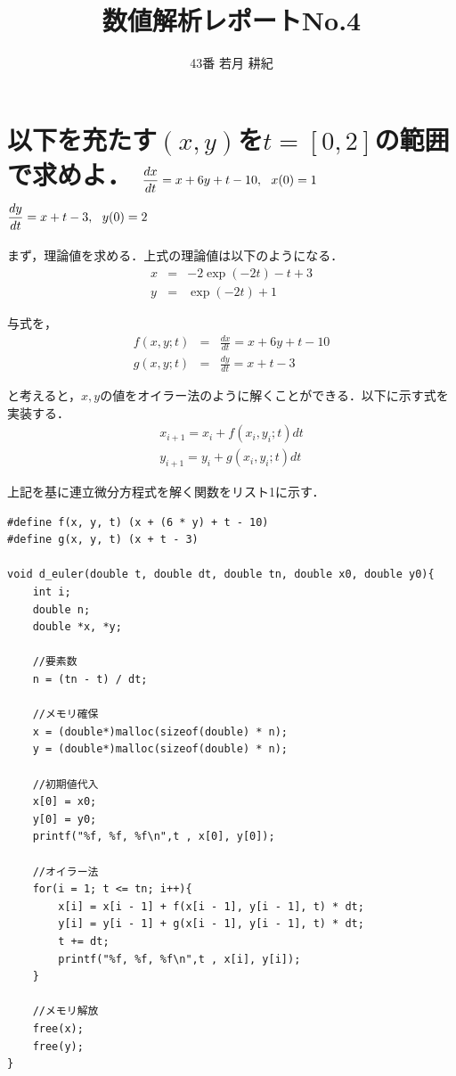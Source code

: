 \documentclass[dvipdfmx,titlepage]{jsarticle}
\title{\Huge{数値解析レポートNo.4}}
\author{\huge{43番 若月 耕紀}}
\date{}
\begin{document}
\maketitle
\newpage


\section{以下を充たす$(x, y)$を$t = [0, 2]$の範囲で求めよ．\protect\linebreak
$\dfrac{dx}{dt} = x + 6y + t - 10, \:\:\:x(0) = 1\raisebox{4ex}{\mbox{}}$\protect\linebreak
$\dfrac{dy}{dt} = x + t - 3, \:\:\:y(0) = 2\raisebox{4ex}{\mbox{}}$}
\:

まず，理論値を求める．上式の理論値は以下のようになる．
\begin{eqnarray}
x &=& -2\exp(-2t)-t+3 \nonumber \\
y &=& \exp(-2t)+1 \nonumber
\end{eqnarray}

与式を，
\begin{eqnarray}
f(x, y; t) &=& \frac{dx}{dt} = x + 6y + t - 10 \nonumber \\
g(x, y; t) &=& \frac{dy}{dt} = x + t - 3 \nonumber
\end{eqnarray}

と考えると，$x, y$の値をオイラー法のように解くことができる．以下に示す式を実装する．
\begin{eqnarray}
x_{i+1} = x_i + f(x_i, y_i; t)dt \nonumber \\
y_{i+1} = y_i + g(x_i, y_i; t)dt \nonumber
\end{eqnarray}

上記を基に連立微分方程式を解く関数をリスト1に示す．

\begin{lstlisting}[caption=d\_euler, label=c]
#define f(x, y, t) (x + (6 * y) + t - 10)
#define g(x, y, t) (x + t - 3)

void d_euler(double t, double dt, double tn, double x0, double y0){
	int i;
	double n;
	double *x, *y;

	//要素数
	n = (tn - t) / dt;

	//メモリ確保
	x = (double*)malloc(sizeof(double) * n);
	y = (double*)malloc(sizeof(double) * n);

	//初期値代入
	x[0] = x0;
	y[0] = y0;
	printf("%f, %f, %f\n",t , x[0], y[0]);

	//オイラー法
	for(i = 1; t <= tn; i++){
		x[i] = x[i - 1] + f(x[i - 1], y[i - 1], t) * dt;
		y[i] = y[i - 1] + g(x[i - 1], y[i - 1], t) * dt;
		t += dt;
		printf("%f, %f, %f\n",t , x[i], y[i]);
	}

	//メモリ解放
	free(x);
	free(y);
}
\end{lstlisting}
\end{document}
